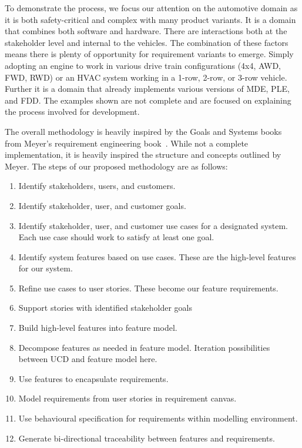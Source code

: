 To demonstrate the process, we focus our attention on the automotive domain as it is both safety-critical and complex with many product variants. It is a domain that combines both software and hardware. There are interactions both at the stakeholder level and internal to the vehicles. The combination of these factors means there is plenty of opportunity for requirement variants to emerge. Simply adopting an engine to work in various drive train configurations (4x4, AWD, FWD, RWD) or an HVAC system working in a 1-row, 2-row, or 3-row vehicle. Further it is a domain that already implements various versions of \ac{MDE}, \ac{PLE}, and \ac{FDD}. The examples shown are not complete and are focused on explaining the process involved for development. 

The overall methodology is heavily inspired by the Goals and Systems books from Meyer's requirement engineering book~\cite{meyer2022handbook}. While not a complete implementation, it is heavily inspired the structure and concepts outlined by Meyer. The steps of our proposed methodology are as follows:
\begin{enumerate}
	\item Identify stakeholders, users, and customers.
	\item Identify stakeholder, user, and customer goals.
	\item Identify stakeholder, user, and customer use cases for a designated system. Each use case should work to satisfy at least one goal.
	\item Identify system features based on use cases. These are the high-level features for our system.
	\item Refine use cases to user stories. These become our feature requirements.
	\item Support stories with identified stakeholder goals
	\item Build high-level features into feature model.
	\item Decompose features as needed in feature model. Iteration possibilities between UCD and feature model here.
	\item Use features to encapsulate requirements.
	\item Model requirements from user stories in requirement canvas.
	\item Use behavioural specification for requirements within modelling environment.
	\item Generate bi-directional traceability between features and requirements.
\end{enumerate}

